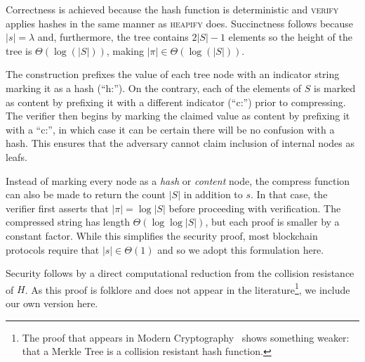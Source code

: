 Correctness is achieved because the hash function is deterministic and
\textsc{verify} applies hashes in the same manner as \textsc{heapify} does.
Succinctness follows because $|s| = \lambda$ and, furthermore, the tree contains
$2|S| - 1$ elements so the height of the tree is $\Theta(\log(|S|))$, making
$|\pi| \in \Theta(\log(|S|))$.

The construction prefixes the value of each tree node with an indicator string
marking it as a hash (``h:''). On the contrary, each of the elements of $S$ is
marked as content by prefixing it with a different indicator (``c:'') prior to
compressing. The verifier then begins by marking the claimed value as content by
prefixing it with a ``c:'', in which case it can be certain there will be no
confusion with a hash. This ensures that the adversary cannot claim inclusion of
internal nodes as leafs.

\begin{remark}
  Instead of marking every node as a \emph{hash} or \emph{content} node, the
  \textsf{compress} function can also be made to return the count $|S|$ in
  addition to $s$. In that case, the verifier first asserts that
  $|\pi| = \log|S|$ before proceeding with verification. The compressed string
  has length $\Theta(\log\log|S|)$, but each proof is smaller by a constant
  factor. While this simplifies the security proof, most blockchain protocols
  require that $|s| \in \Theta(1)$ and so we adopt this formulation here.
\end{remark}

Security follows by a direct computational reduction from the collision
resistance of $H$. As this proof is folklore and does not appear in the
literature\footnote{The proof that appears in Modern
Cryptography~\cite{katz} shows something weaker: that a Merkle Tree is a
collision resistant hash function.}, we include our own version here.



